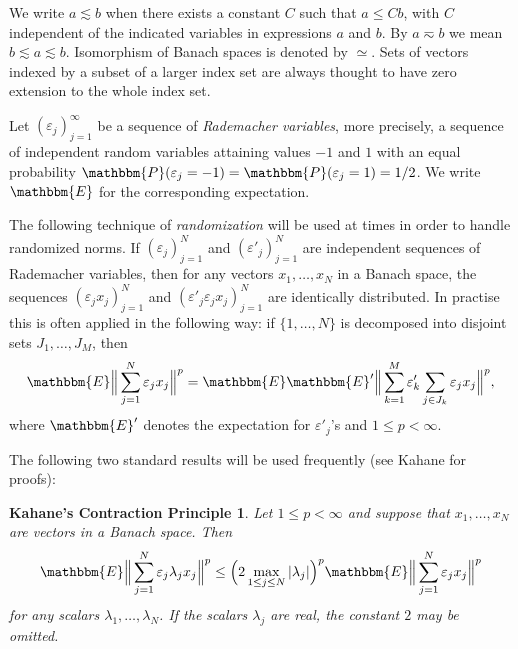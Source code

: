 \documentclass[a4paper,10pt]{amsart}
\theoremstyle{plain}
\newtheorem*{contraction}{Kahane's Contraction Principle}
\theoremstyle{definition}
\theoremstyle{remark}
\begin{document}
We write $a \lesssim b$ when there exists a constant $C$ such that $a \leq Cb$, with $C$ 
independent of the indicated variables in expressions $a$ and $b$. By $a\eqsim b$ we mean $b\lesssim a \lesssim b$. 
Isomorphism of Banach spaces is denoted by $\simeq$. Sets of vectors indexed by a subset of a larger index set are
always thought to have zero extension to the whole index set.

Let $(\varepsilon_j)_{j=1}^{\infty}$ be a sequence of \emph{Rademacher variables}, more precisely, a
sequence of independent random variables attaining values $-1$ and $1$ with an equal probability
${\mathbbm{P}} (\varepsilon_j = -1) = {\mathbbm{P}} (\varepsilon_j = 1) = 1/2$. We write ${\mathbbm{E}}$ for the corresponding expectation.

The following technique of \emph{randomization} will be used at times in order to handle randomized norms.
If $(\varepsilon_j)_{j=1}^N$ and $(\varepsilon'_j)_{j=1}^N$ are independent sequences of Rademacher variables,
then for any vectors $x_1, \ldots , x_N$ in a Banach space, the sequences $(\varepsilon_j x_j)_{j=1}^N$ and
$(\varepsilon'_j \varepsilon_j x_j)_{j=1}^N$ are identically distributed. In practise this is often applied in the
following way: if $\{ 1, \ldots , N \}$ is decomposed into disjoint sets $J_1, \ldots , J_M$, then
\begin{equation*}
  {\mathbbm{E}} \Big\| \sum_{j=1}^N \varepsilon_j x_j \Big\| ^p 
  = {\mathbbm{E}} {\mathbbm{E}} ' \Big\| \sum_{k=1}^M \varepsilon'_k \sum_{j\in J_k} \varepsilon_j x_j \Big\| ^p ,
\end{equation*}
where ${\mathbbm{E}} '$ denotes the expectation for $\varepsilon'_j$'s and $1\leq p < \infty$.

The following two standard results will be used frequently (see Kahane \cite{KAHANE} for proofs):

\begin{contraction}
  \label{contraction}
  Let $1\leq p < \infty$ and suppose that $x_1, \ldots , x_N$ are vectors in a Banach space. Then
  \begin{equation*}
    {\mathbbm{E}} \Big\| \sum_{j=1}^N \varepsilon_j \lambda_j x_j \Big\| ^p \leq \Big( 2\max_{1\leq j \leq N} | \lambda_j | \Big) ^p
    {\mathbbm{E}} \Big\| \sum_{j=1}^N \varepsilon_j x_j \Big\| ^p 
  \end{equation*}
  for any scalars $\lambda_1,\ldots , \lambda_N$.
  If the scalars $\lambda_j$ are real, the constant $2$ may be omitted.
\end{contraction}
\end{document}
